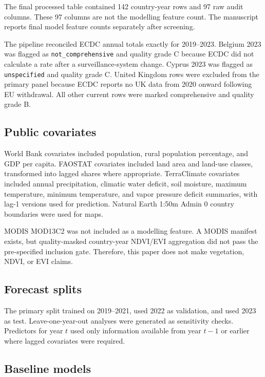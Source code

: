 \documentclass[11pt]{article}
\begin{document}
The final processed table contained 142 country-year rows and 97 raw audit columns. These 97 columns are not the modelling feature count. The manuscript reports final model feature counts separately after screening.

The pipeline reconciled ECDC annual totals exactly for 2019--2023. Belgium 2023 was flagged as \texttt{not\_comprehensive} and quality grade C because ECDC did not calculate a rate after a surveillance-system change. Cyprus 2023 was flagged as \texttt{unspecified} and quality grade C. United Kingdom rows were excluded from the primary panel because ECDC reports no UK data from 2020 onward following EU withdrawal. All other current rows were marked comprehensive and quality grade B.

\subsection{Public covariates}

World Bank covariates included population, rural population percentage, and GDP per capita. FAOSTAT covariates included land area and land-use classes, transformed into lagged shares where appropriate. TerraClimate covariates included annual precipitation, climatic water deficit, soil moisture, maximum temperature, minimum temperature, and vapor pressure deficit summaries, with lag-1 versions used for prediction. Natural Earth 1:50m Admin 0 country boundaries were used for maps.

MODIS MOD13C2 was not included as a modelling feature. A MODIS manifest exists, but quality-masked country-year NDVI/EVI aggregation did not pass the pre-specified inclusion gate. Therefore, this paper does not make vegetation, NDVI, or EVI claims.

\subsection{Forecast splits}

The primary split trained on 2019--2021, used 2022 as validation, and used 2023 as test. Leave-one-year-out analyses were generated as sensitivity checks. Predictors for year \(t\) used only information available from year \(t-1\) or earlier where lagged covariates were required.

\subsection{Baseline models}
\end{document}

